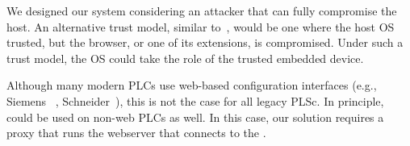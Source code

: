  We designed our system considering an attacker that can fully compromise the host. An alternative trust model, similar to~\cite{gyrus,nab}, would be one where the host OS trusted, but the browser, or one of its extensions, is compromised. Under such a trust model, the OS could take the role of the trusted embedded device. 


 Although many modern PLCs use web-based configuration interfaces (e.g., Siemens ~\cite{siemens,siemens2}, Schneider~\cite{schneider}), this is not the case for all legacy PLSc. In principle, \name could be used on non-web PLCs as well. In this case, our solution requires a proxy that runs the webserver that connects to the \device.

